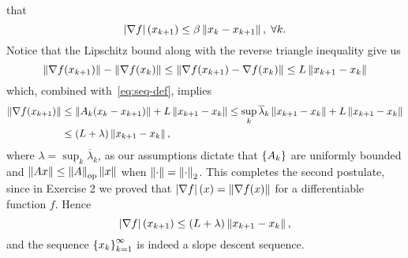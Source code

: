 \documentclass[10pt]{article}
\begin{document}
\begin{Exercise}
	that
	\[
		\left| \nabla f \right|(x_{k+1}) \leq \beta \left \| x_k - x_{k+1} \right \|, \; \forall k.
	\]
	Notice that the Lipschitz bound along with the reverse triangle inequality
	give us
	\[
		\left \| \nabla f(x_{k+1}) \right \| - \left \| \nabla f(x_k) \right \| \leq
		\left \| \nabla f(x_{k+1}) - \nabla f(x_k) \right \| \leq L \left \| x_{k+1} - x_k \right \|
	\]
	which, combined with~\eqref{eq:seq-def}, implies
	\begin{align*}
		\left \| \nabla f(x_{k+1}) \right \| &\leq \left \| A_k (x_k - x_{k+1}) \right \| + L
		\left \| x_{k+1} - x_k \right \| \leq \sup_k \overline{\lambda}_k \left \| x_{k+1} -
		x_k \right \| + L \left \| x_{k+1} - x_k \right \| \\
		&\leq \left(L + \lambda\right) \left \| x_{k+1} - x_k \right \|,
	\end{align*}
	where $\lambda = \sup_k \overline{\lambda}_k$, as our assumptions dictate
	that $\left\{ A_k \right\}$ are uniformly bounded and $\left \| Ax \right \| \leq \left \|  A  \right \|_{\mathrm{op}}
	\left \| x \right \|$ when $\left \| \cdot \right \| = \left \| \cdot \right \|_2$. This completes the second
	postulate, since in Exercise 2 we proved that $\left| \nabla f \right|(x) =
	\left \| \nabla f(x) \right \|$ for a differentiable function $f$. Hence
	\[
		\left| \nabla f \right|(x_{k+1}) \leq \left(L + \lambda\right) \left \| x_{k+1} -
		x_k \right \|,
	\]
	and the sequence $\left\{ x_k \right\}_{k=1}^{\infty}$ is indeed a slope descent
	sequence.
\end{Exercise}
\end{document}
